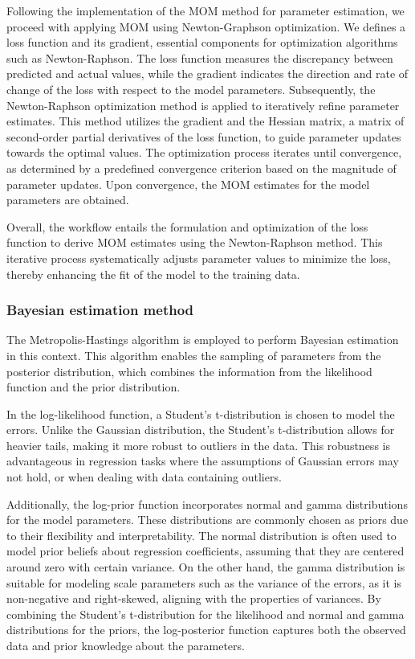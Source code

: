 \documentclass[12pt]{article}
\begin{document}
	Following the implementation of the MOM method for parameter estimation, we proceed with applying MOM using Newton-Graphson optimization. We defines a loss function and its gradient, essential components for optimization algorithms such as Newton-Raphson. The loss function measures the discrepancy between predicted and actual values, while the gradient indicates the direction and rate of change of the loss with respect to the model parameters. Subsequently, the Newton-Raphson optimization method is applied to iteratively refine parameter estimates. This method utilizes the gradient and the Hessian matrix, a matrix of second-order partial derivatives of the loss function, to guide parameter updates towards the optimal values. The optimization process iterates until convergence, as determined by a predefined convergence criterion based on the magnitude of parameter updates. Upon convergence, the MOM estimates for the model parameters are obtained.
	
	Overall, the workflow entails the formulation and optimization of the loss function to derive MOM estimates using the Newton-Raphson method. This iterative process systematically adjusts parameter values to minimize the loss, thereby enhancing the fit of the model to the training data.
	
	\subsubsection{Bayesian estimation method}
	
	The Metropolis-Hastings algorithm is employed to perform Bayesian estimation in this context. This algorithm enables the sampling of parameters from the posterior distribution, which combines the information from the likelihood function and the prior distribution.
	
	In the log-likelihood function, a Student's t-distribution is chosen to model the errors. Unlike the Gaussian distribution, the Student's t-distribution allows for heavier tails, making it more robust to outliers in the data. This robustness is advantageous in regression tasks where the assumptions of Gaussian errors may not hold, or when dealing with data containing outliers.
	
	Additionally, the log-prior function incorporates normal and gamma distributions for the model parameters. These distributions are commonly chosen as priors due to their flexibility and interpretability. The normal distribution is often used to model prior beliefs about regression coefficients, assuming that they are centered around zero with certain variance. On the other hand, the gamma distribution is suitable for modeling scale parameters such as the variance of the errors, as it is non-negative and right-skewed, aligning with the properties of variances. By combining the Student's t-distribution for the likelihood and normal and gamma distributions for the priors, the log-posterior function captures both the observed data and prior knowledge about the parameters.
	
\end{document}

